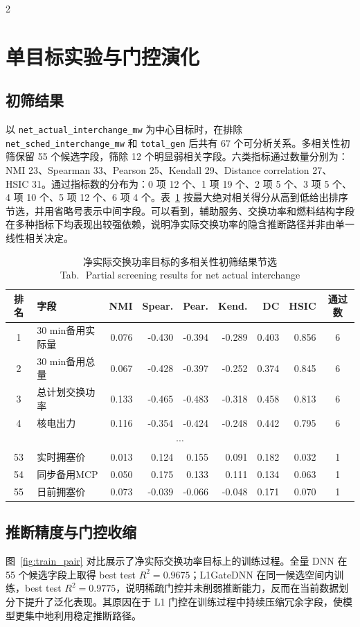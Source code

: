 \documentclass[UTF8,zihao=5,twoside]{ctexart}
\numberwithin{equation}{section}
\newcommand{\tabbicaption}[2]{%
  \caption{#1\\[-0.2em]\small Tab.\,\thetable\ #2}
}
\newcommand{\code}[1]{\texttt{#1}}
\begin{document}
\begin{multicols}{2}
\section{单目标实验与门控演化}
\subsection{初筛结果}
以 \code{net\_actual\_interchange\_mw} 为中心目标时，在排除 \code{net\_sched\_interchange\_mw} 和 \code{total\_gen} 后共有 67 个可分析关系。多相关性初筛保留 55 个候选字段，筛除 12 个明显弱相关字段。六类指标通过数量分别为：NMI 23、Spearman 33、Pearson 25、Kendall 29、Distance correlation 27、HSIC 31。通过指标数的分布为：0 项 12 个、1 项 19 个、2 项 5 个、3 项 5 个、4 项 10 个、5 项 12 个、6 项 4 个。表~\ref{tab:screening_top} 按最大绝对相关得分从高到低给出排序节选，并用省略号表示中间字段。可以看到，辅助服务、交换功率和燃料结构字段在多种指标下均表现出较强依赖，说明净实际交换功率的隐含推断路径并非由单一线性相关决定。

\begin{table}[H]
\centering
\scriptsize
\setlength{\tabcolsep}{1pt}
\tabbicaption{净实际交换功率目标的多相关性初筛结果节选}{Partial screening results for net actual interchange}
\label{tab:screening_top}
\begin{tabularx}{\columnwidth}{cXrrrrrrc}
\toprule
排名 & 字段 & NMI & Spear. & Pear. & Kend. & DC & HSIC & 通过数 \\
\midrule
1 & 30 min备用实际量 & 0.076 & -0.430 & -0.394 & -0.289 & 0.403 & 0.856 & 6 \\
2 & 30 min备用总量 & 0.067 & -0.428 & -0.397 & -0.252 & 0.374 & 0.845 & 6 \\
3 & 总计划交换功率 & 0.133 & -0.465 & -0.483 & -0.318 & 0.458 & 0.813 & 6 \\
4 & 核电出力 & 0.116 & -0.354 & -0.424 & -0.248 & 0.442 & 0.795 & 6 \\
\multicolumn{9}{c}{\(\cdots\)} \\
53 & 实时拥塞价 & 0.013 & 0.124 & 0.155 & 0.091 & 0.182 & 0.032 & 1 \\
54 & 同步备用MCP & 0.050 & 0.175 & 0.133 & 0.111 & 0.134 & 0.063 & 1 \\
55 & 日前拥塞价 & 0.073 & -0.039 & -0.066 & -0.048 & 0.171 & 0.070 & 1 \\
\bottomrule
\end{tabularx}
\end{table}

\subsection{推断精度与门控收缩}
图~\ref{fig:train_pair} 对比展示了净实际交换功率目标上的训练过程。全量 DNN 在 55 个候选字段上取得 best test $R^2=0.9675$；L1GateDNN 在同一候选空间内训练，best test $R^2=0.9775$，说明稀疏门控并未削弱推断能力，反而在当前数据划分下提升了泛化表现。其原因在于 L1 门控在训练过程中持续压缩冗余字段，使模型更集中地利用稳定推断路径。


\end{multicols}
\end{document}
